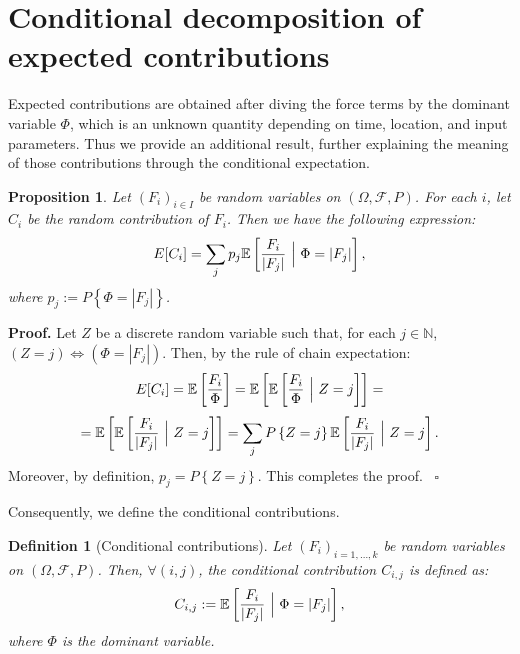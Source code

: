 \documentclass{article}
\newtheorem{definition}[theorem]{Definition}
\newtheorem{proposition}[theorem]{Proposition}
\newenvironment{proof}[1][Proof]{\noindent\textbf{#1.} }{\ $\square$}
\begin{document}
\section{Conditional decomposition of expected contributions}\label{A-2}
Expected contributions are obtained after diving the force terms by the dominant variable $\Phi$, which is an unknown quantity depending on time, location, and input parameters. Thus we provide an additional result, further explaining the meaning of those contributions through the conditional expectation.

\begin{proposition}
Let $(F_i)_{i\in I}$ be random variables on $(\Omega, \mathcal F, P)$. For each $i$, let $C_i$ be the random contribution of $F_i$. Then we have the following expression:
$$E[C_i]=\sum_j p_j \mathbb E\left[\frac{F_i}{|F_j|}\ \Big{|}\ \Phi=|F_j|\right],$$
where $p_j:=P\left\{\Phi=|F_j|\right\}$.
\end{proposition}

\begin{proof}
Let $Z$ be a discrete random variable such that, for each $j\in\mathbb N$, $(Z=j) \Longleftrightarrow (\Phi=|F_j|)$. Then, by the rule of chain expectation:
$$E[C_i]=\mathbb E\left[\frac{F_i}{\Phi}\right]=\mathbb E\left[\mathbb E\left[\frac{F_i}{\Phi}\ \Big{|}\ Z=j\right]\right]=$$
$$=\mathbb E\left[\mathbb E\left[\frac{F_i}{|F_j|}\ \Big{|}\ Z=j\right]\right]=\sum_j P\left\{Z=j\right\} \mathbb E\left[\frac{F_i}{|F_j|}\ \Big{|}\ Z=j\right].$$
Moreover, by definition, $p_j=P\left\{Z=j\right\}$. This completes the proof.
\end{proof}

Consequently, we define the conditional contributions.

\begin{definition}[Conditional contributions]
Let $(F_i)_{i=1,\dots, k}$ be random variables on $(\Omega, \mathcal F, P)$. Then, $\forall (i,j)$, the conditional contribution $C_{i,j}$ is defined as:
$$C_{i,j}:=\mathbb E\left[\frac{F_i}{|F_j|}\ \Big{|}\ \Phi=|F_j|\right],$$
where $\Phi$ is the dominant variable.
\end{definition}

\newpage


\end{document}
